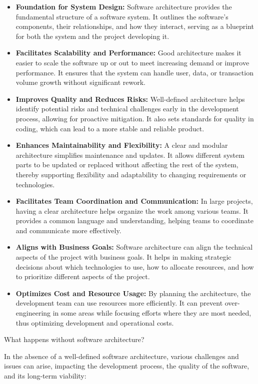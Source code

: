 \begin{itemize}
    \item \textbf{Foundation for System Design:} Software architecture provides the fundamental structure of a software system. It outlines the software's components, their relationships, and how they interact, serving as a blueprint for both the system and the project developing it.
    \item \textbf{Facilitates Scalability and Performance:} Good architecture makes it easier to scale the software up or out to meet increasing demand or improve performance. It ensures that the system can handle user, data, or transaction volume growth without significant rework.
    \item \textbf{Improves Quality and Reduces Risks:} Well-defined architecture helps identify potential risks and technical challenges early in the development process, allowing for proactive mitigation. It also sets standards for quality in coding, which can lead to a more stable and reliable product.
    \item \textbf{Enhances Maintainability and Flexibility:} A clear and modular architecture simplifies maintenance and updates. It allows different system parts to be updated or replaced without affecting the rest of the system, thereby supporting flexibility and adaptability to changing requirements or technologies.
    \item \textbf{Facilitates Team Coordination and Communication:} In large projects, having a clear architecture helps organize the work among various teams. It provides a common language and understanding, helping teams to coordinate and communicate more effectively.
    \item \textbf{Aligns with Business Goals:} Software architecture can align the technical aspects of the project with business goals. It helps in making strategic decisions about which technologies to use, how to allocate resources, and how to prioritize different aspects of the project.
    \item \textbf{Optimizes Cost and Resource Usage:} By planning the architecture, the development team can use resources more efficiently. It can prevent over-engineering in some areas while focusing efforts where they are most needed, thus optimizing development and operational costs.
\end{itemize}

What happens without software architecture?~\cite{openai2023chatgpt}

In the absence of a well-defined software architecture, various challenges and issues can arise, impacting the development process, the quality of the software, and its long-term viability:

